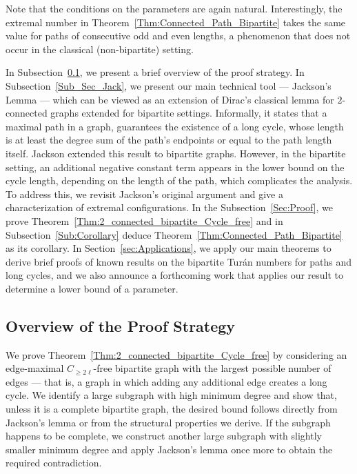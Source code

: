 \documentclass[11pt,a4paper]{article}
\begin{document}
Note that the conditions on the parameters are again natural.
Interestingly, the extremal number in Theorem~\ref{Thm:Connected_Path_Bipartite} takes the same value for paths of consecutive odd and even lengths, a phenomenon that does not occur in the classical (non-bipartite) setting.


In Subsection~\ref{Sub_Sec:Sketch}, we present a brief overview of the proof strategy.
 In  Subsection~\ref{Sub_Sec_Jack}, we present our main technical tool — Jackson’s Lemma — which can be viewed as an extension of Dirac’s classical lemma for $2$-connected graphs extended for bipartite settings.
Informally, it states that a maximal path in a graph,
 guarantees the existence of a long cycle, whose length is at least the degree sum of the path’s endpoints or equal to the path length itself.
Jackson extended this result to bipartite graphs.
However, in the bipartite setting, an additional negative constant term appears in the lower bound on the cycle length, depending on the length of the path, which complicates the analysis.
To address this, we revisit Jackson’s original argument and give a characterization of extremal configurations.
In the Subsection~\ref{Sec:Proof}, we prove Theorem~\ref{Thm:2_connected_bipartite_Cycle_free} and in Subsection~\ref{Sub:Corollary} deduce Theorem~\ref{Thm:Connected_Path_Bipartite} as its corollary. 
In Section~\ref{sec:Applications}, we apply our main theorems to derive brief proofs of known results on the bipartite Turán numbers for paths and long cycles, and we also announce a forthcoming work that applies our result to determine a lower bound of a parameter.


\subsection{Overview of the Proof Strategy}\label{Sub_Sec:Sketch}

We prove Theorem~\ref{Thm:2_connected_bipartite_Cycle_free} by considering an edge-maximal $C_{\ge 2\ell}$-free bipartite graph with the largest possible number of edges — that is, a graph in which adding any additional edge creates a long cycle.
We identify a large subgraph with high minimum degree and show that, unless it is a complete bipartite graph, the desired bound follows directly from Jackson’s lemma or from the structural properties we derive.
If the subgraph happens to be complete, we construct another large subgraph with slightly smaller minimum degree and apply Jackson’s lemma once more to obtain the required contradiction.
\end{document}
